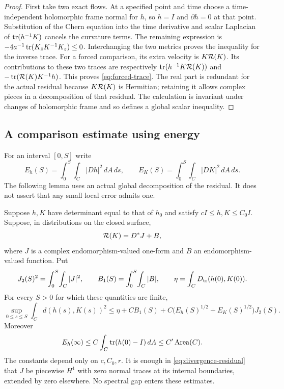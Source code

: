 \begin{proof}
First take two exact flows. At a specified point and time choose a
time-independent holomorphic frame normal for $h$, so $h=I$ and
$\partial h=0$ at that point. Substitution of the Chern equation
into the time derivative and scalar Laplacian of $\operatorname{tr}(h^{-1}K)$
cancels the curvature terms. The remaining expression is
$-4a^{-1}\operatorname{tr}(K_{\bar z}K^{-1}K_z)\le0$. Interchanging the two
metrics proves the inequality for the inverse trace. For a forced
comparison, its extra velocity is $K\mathcal R(K)$. Its contributions to
these two traces are respectively
$\operatorname{tr}(h^{-1}K\mathcal R(K))$ and $-\operatorname{tr}(\mathcal R(K)K^{-1}h)$.
This proves \eqref{eq:forced-trace}. The real part is redundant for
the actual residual because $K\mathcal R(K)$ is Hermitian; retaining it
allows complex pieces in a decomposition of that residual. The
calculation is invariant under changes of holomorphic frame and so
defines a global scalar inequality.
\end{proof}

\subsection{A comparison estimate using energy}
For an interval $[0,S]$ write
\[
 E_h(S)=\int_0^S\!\int_C|Dh|^2\,dA\,ds,
 \qquad E_K(S)=\int_0^S\!\int_C|DK|^2\,dA\,ds.
\]
The following lemma uses an actual global decomposition of the
residual. It does not assert that any small local error admits one.

\begin{lemma}\label{lem:weak-comparison}
Suppose $h,K$ have determinant equal to that of $h_0$ and satisfy
$cI\le h,K\le C_0I$. Suppose, in distributions on the closed
surface,
\begin{equation}\label{eq:divergence-residual}
 \mathcal R(K)=D^*J+B,
\end{equation}
where $J$ is a complex endomorphism-valued one-form and $B$ an
endomorphism-valued function. Put
\[
 J_2(S)^2=\int_0^S\!\int_C|J|^2,\qquad
 B_1(S)=\int_0^S\!\int_C|B|,\qquad
 \eta=\int_C D_{\operatorname{tr}}(h(0),K(0)).
\]
For every $S>0$ for which these quantities are finite,
\begin{equation}\label{eq:weak-comparison}
 \sup_{0\le s\le S}\int_Cd(h(s),K(s))^2
 \le\eta+C B_1(S)
       +C\bigl(E_h(S)^{1/2}+E_K(S)^{1/2}\bigr)J_2(S).
\end{equation}
Moreover
\begin{equation}\label{eq:actual-energy}
 E_h(\infty)\le C\int_C\operatorname{tr}(h(0)-I)\,dA
                         \le C'\operatorname{Area}(C).
\end{equation}
The constants depend only on $c,C_0,r$. It is enough in
\eqref{eq:divergence-residual} that $J$ be piecewise $H^1$ with
zero normal traces at its internal boundaries, extended by zero
elsewhere. No spectral gap enters these estimates.
\end{lemma}

